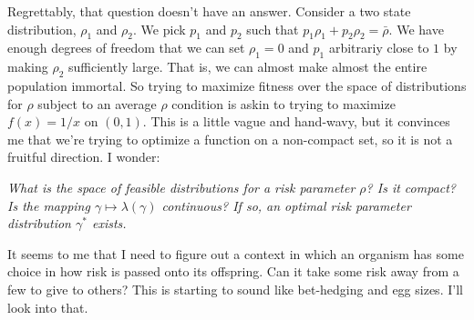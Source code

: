 Regrettably, that question doesn't have an answer. Consider a two state distribution, $\rho_1$ and $\rho_2$. We pick $p_1$ and $p_2$
such that $p_1 \rho_1 + p_2\rho_2 = \bar\rho$. We have enough degrees of freedom that we can set $\rho_1 = 0$ 
and $p_1$ arbitrariy close to $1$ by making $\rho_2$ sufficiently large. That is, we can almost make almost the entire population immortal.
So trying to maximize fitness over the space of distributions for $\rho$ subject to an average $\rho$ condition is askin to trying
to maximize $f(x) = 1/x$ on $(0, 1)$. This is a little vague and hand-wavy, but it convinces me that we're trying to optimize a function
on a non-compact set, so it is not a fruitful direction. I wonder:

\begin{center}
    \textit{What is the space of feasible distributions for a risk parameter $\rho$? Is it compact? Is the mapping
    $\gamma\mapsto \lambda(\gamma) $ continuous? If so, an optimal risk parameter distribution $\gamma^*$ exists.}
\end{center}

It seems to me that I need to figure out a context in which an organism has some choice in how risk is passed onto its offspring. 
Can it take some risk away from a few to give to others? This is starting to sound like bet-hedging and egg sizes. I'll look into that.


